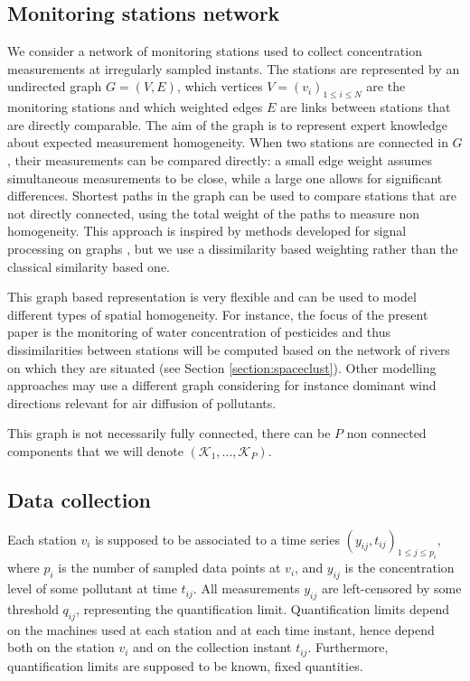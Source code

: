 \subsection{Monitoring stations network}\label{subsection:graph}

We consider a network of monitoring stations used to collect concentration measurements at irregularly sampled instants. The stations are represented by an undirected graph $G=(V, E)$, which vertices $V=(v_i)_{1\leq i\leq N}$ are the monitoring stations and which weighted edges $E$ are links between stations that are directly comparable. The aim of the graph is to represent expert knowledge about expected measurement homogeneity. When two stations are connected in $G$, their measurements can be compared directly: a small edge weight assumes simultaneous measurements to be close, while a large one allows for significant differences. Shortest paths in the graph can be used to compare stations that are not directly connected, using the total weight of the paths to measure non homogeneity. This approach is inspired by methods developed for signal processing on graphs \cite{6494675}, but we use a dissimilarity based weighting rather than the classical similarity based one. 

This graph based representation is very flexible and can be used to model different types of spatial homogeneity. For instance, the focus of the present paper is the monitoring of water concentration of pesticides and thus dissimilarities between stations will be computed based on the network of rivers on which they are situated (see Section \ref{section:spaceclust}). Other modelling approaches may use a different graph considering for instance dominant wind directions relevant for air diffusion of pollutants. 

This graph is not necessarily fully connected, there can be $P$ non connected components that we will denote $(\mathcal{K}_1,...,\mathcal{K}_P)$.

\subsection{Data collection}\label{subsection:data:collection}

Each station $v_i$ is supposed to be associated to a time series $(y_{ij},t_{ij})_{1\leq j\leq p_i}$, where $p_i$ is the number of sampled data points at $v_i$, and $y_{ij}$ is the concentration level of some pollutant at time $t_{ij}$. All measurements $y_{ij}$ are left-censored by some threshold $q_{ij}$, representing the quantification limit. Quantification limits depend on the machines used at each station and at each time instant, hence depend both on the station $v_i$ and on the collection instant $t_{ij}$. Furthermore, quantification limits are supposed to be known, fixed quantities. 

